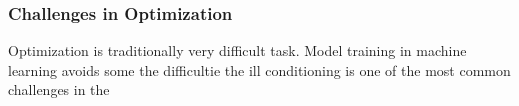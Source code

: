 \subsubsection{Challenges in Optimization}

Optimization is traditionally very difficult task. Model training in machine learning avoids some the difficultie
the ill conditioning is one of the most common challenges in the 